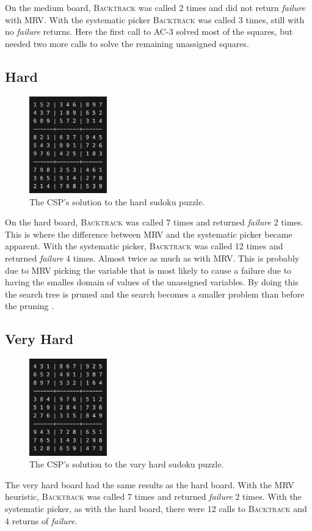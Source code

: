 On the medium board, \textsc{Backtrack} was called 2 times and did not return \textit{failure} with MRV. With the systematic picker \textsc{Backtrack} was called 3 times, still with no \textit{failure} returns. Here the first call to \textsc{AC-3} solved most of the squares, but needed two more calls to solve the remaining unassigned squares. 

\newpage

\subsection*{Hard}

\begin{figure}[h!]
    \centering
    \includegraphics[width=0.3\textwidth]{"../Images/hard.png"}
    \caption{The CSP's solution to the hard sudoku puzzle.}
\end{figure}

On the hard board, \textsc{Backtrack} was called 7 times and returned \textit{failure} 2 times. This is where the difference between MRV and the systematic picker became apparent. With the systematic picker, \textsc{Backtrack} was called 12 times and returned \textit{failure} 4 times. Almost twice as much as with MRV. This is probably due to MRV picking the variable that is most likely to cause a failure due to having the smalles domain of values of the unassigned variables. By doing this the search tree is pruned and the search becomes a smaller problem than before the pruning \cite{aima}. 

\subsection*{Very Hard}

\begin{figure}[h!]
    \centering
    \includegraphics[width=0.3\textwidth]{"../Images/veryhard.png"}
    \caption{The CSP's solution to the vary hard sudoku puzzle.}
\end{figure}

The very hard board had the same results as the hard board. With the MRV heuristic, \textsc{Backtrack} was called 7 times and returned \textit{failure} 2 times. With the systematic picker, as with the hard board, there were 12 calls to \textsc{Backtrack} and 4 returns of \textit{failure}. 

